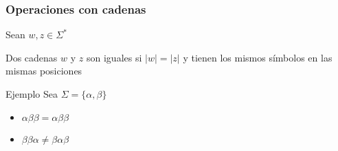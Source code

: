 \begin{frame}
  \frametitle{Operaciones con cadenas}
	   Sean $w, z \in \Sigma^*$
      \begin{defi}
			Dos cadenas $w$ y $z$ son iguales si $|w|=|z|$ y tienen los mismos símbolos en las mismas posiciones
      \end{defi}

      \pause
			\begin{block}{Ejemplo}
			  Sea $\Sigma = \{ \alpha, \beta\}$ 
           \begin{itemize}[<+->]
           \item $\alpha \beta \beta = \alpha \beta \beta$
           \item $\beta \beta \alpha \not = \beta \alpha \beta$
           \end{itemize}
			\end{block}
\end{frame}
